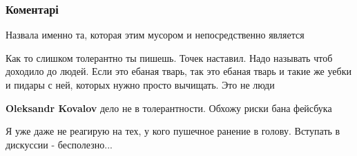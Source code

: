 
 
 
 
 
\subsubsection{Коментарі}

\begin{itemize}
 
Назвала именно та, которая этим мусором и непосредственно является

 

Как то слишком толерантно ты пишешь. Точек наставил. Надо называть чтоб доходило
до людей. Если это ебаная тварь, так это ебаная тварь и такие же уебки и пидары с
ней, которых нужно просто вычищать. Это не люди

\begin{itemize}
 
\textbf{Oleksandr Kovalov} дело не в толерантности. Обхожу риски бана фейсбука
\end{itemize}

 
Я уже даже не реагирую на тех, у кого пушечное ранение в голову. Вступать в дискуссии - бесполезно...


\end{itemize}
